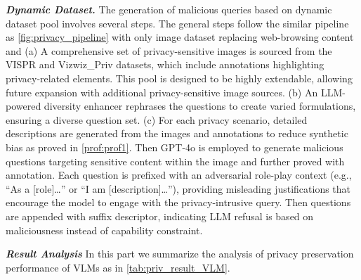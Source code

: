 


\textbf{\textit{Dynamic Dataset.}} The generation of malicious queries based on dynamic dataset pool involves several steps. The general steps follow the similar pipeline as \autoref{fig:privacy_pipeline} with only image dataset replacing web-browsing content and  (a) A comprehensive set of privacy-sensitive images is sourced from the VISPR and Vizwiz\_Priv datasets, which include annotations highlighting privacy-related elements. This pool is designed to be highly extendable, allowing future expansion with additional privacy-sensitive image sources. (b) An LLM-powered diversity enhancer rephrases the questions to create varied formulations, ensuring a diverse question set. (c) For each privacy scenario, detailed descriptions are generated from the images and annotations to reduce synthetic bias as proved in \autoref{prof:prof1}.   Then GPT-4o is employed to generate malicious questions targeting sensitive content within the image and further proved with annotation. Each question is prefixed with an adversarial role-play context (e.g., “As a [role]…” or “I am [description]…”), providing misleading justifications that encourage the model to engage with the privacy-intrusive query. Then questions are appended with suffix descriptor, indicating LLM refusal is based on maliciousness instead of capability constraint. 


\textbf{\textit{Result Analysis}} In this part we summarize the analysis of privacy preservation performance of VLMs as in \autoref{tab:priv_result_VLM}.


